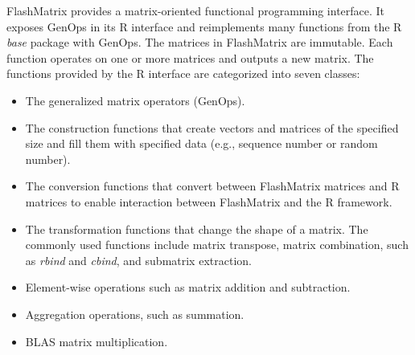 FlashMatrix provides a matrix-oriented functional programming interface.
It exposes GenOps in its R interface and reimplements many functions
from the R \textit{base} package with GenOps. The matrices in FlashMatrix
are immutable. Each function operates on one or more matrices and outputs
a new matrix. The functions provided by the R interface are categorized into
seven classes:
\begin{itemize}
	\item The generalized matrix operators (GenOps).
	\item The construction functions that create vectors and matrices of
		the specified size and fill them with specified data (e.g., sequence
		number or random number).
	\item The conversion functions that convert between FlashMatrix matrices and
		R matrices to enable interaction between FlashMatrix and the R framework.
	\item The transformation functions that change the shape of a matrix.
		The commonly used functions include matrix transpose, matrix combination,
		such as \textit{rbind} and \textit{cbind}, and submatrix extraction.
	\item Element-wise operations such as matrix addition and subtraction.
	\item Aggregation operations, such as summation.
	\item BLAS matrix multiplication.
\end{itemize}




